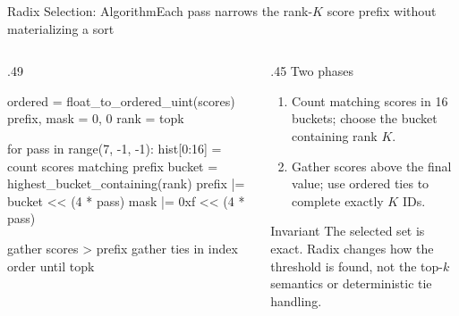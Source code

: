 \documentclass[aspectratio=169,10pt]{beamer}
\renewcommand{\NvidiaSource}[1]{}
\begin{document}
\begin{frame}[fragile]{Radix Selection: Algorithm}{Each pass narrows the rank-$K$ score prefix without materializing a sort}
  \NvidiaSource{TE PR \href{https://github.com/NVIDIA/TransformerEngine/pull/2821}{\#2821};
    \texttt{TE/.../fused\_router/utils.h}}
  \begin{columns}[T,onlytextwidth]
    \begin{column}{.49\textwidth}
      \begin{NvidiaCode}[language=NvidiaPseudo,basicstyle=\ttfamily\fontsize{7.8}{9.2}\selectfont]
ordered = float_to_ordered_uint(scores)
prefix, mask = 0, 0
rank = topk

for pass in range(7, -1, -1):
    hist[0:16] = count scores matching prefix
    bucket = highest_bucket_containing(rank)
    prefix |= bucket << (4 * pass)
    mask   |= 0xf << (4 * pass)

gather scores > prefix
gather ties in index order until topk
      \end{NvidiaCode}
    \end{column}
    \begin{column}{.45\textwidth}
      {\NvidiaSansMedium Two phases}\NvidiaTightRule{.6pt}\vspace{.07in}
      \begin{enumerate}
        \item Count matching scores in 16 buckets; choose the bucket containing rank $K$.
        \item Gather scores above the final value; use ordered ties to complete exactly $K$ IDs.
      \end{enumerate}
      \vspace{.03in}
      \begin{NvidiaEvidence}{Invariant}
        The selected set is exact. Radix changes how the threshold is found, not the top-$k$
        semantics or deterministic tie handling.
      \end{NvidiaEvidence}
    \end{column}
  \end{columns}
\end{frame}
\end{document}
